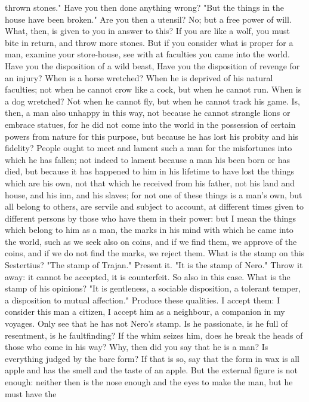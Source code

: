 \documentclass[a4paper]{article}
\begin{document}
thrown stones." Have you then done anything wrong? "But the things in the house
have been broken." Are you then a utensil? No; but a free power of will. What,
then, is given to you in answer to this? If you are like a wolf, you must bite
in return, and throw more stones. But if you consider what is proper for a man,
examine your store-house, see with at faculties you came into the world. Have
you the disposition of a wild beast, Have you the disposition of revenge for an
injury? When is a horse wretched? When he is deprived of his natural faculties;
not when he cannot crow like a cock, but when he cannot run. When is a dog
wretched? Not when he cannot fly, but when he cannot track his game. Is, then,
a man also unhappy in this way, not because he cannot strangle lions or embrace
statues, for he did not come into the world in the possession of certain powers
from nature for this purpose, but because he has lost his probity and his
fidelity? People ought to meet and lament such a man for the misfortunes into
which he has fallen; not indeed to lament because a man his been born or has
died, but because it has happened to him in his lifetime to have lost the
things which are his own, not that which he received from his father, not his
land and house, and his inn, and his slaves; for not one of these things is a
man's own, but all belong to others, are servile and subject to account, at
different times given to different persons by those who have them in their
power: but I mean the things which belong to him as a man, the marks in his
mind with which he came into the world, such as we seek also on coins, and if
we find them, we approve of the coins, and if we do not find the marks, we
reject them. What is the stamp on this Sestertius? "The stamp of Trajan."
Present it. "It is the stamp of Nero." Throw it away: it cannot be accepted, it
is counterfeit. So also in this case. What is the stamp of his opinions? "It is
gentleness, a sociable disposition, a tolerant temper, a disposition to mutual
affection." Produce these qualities. I accept them: I consider this man a
citizen, I accept him as a neighbour, a companion in my voyages. Only see that
he has not Nero's stamp. Is he passionate, is he full of resentment, is he
faultfinding? If the whim seizes him, does he break the heads of those who come
in his way? Why, then did you say that he is a man? Is everything judged by the
bare form? If that is so, say that the form in wax is all apple and has the
smell and the taste of an apple. But the external figure is not enough: neither
then is the nose enough and the eyes to make the man, but he must have the
\end{document}
